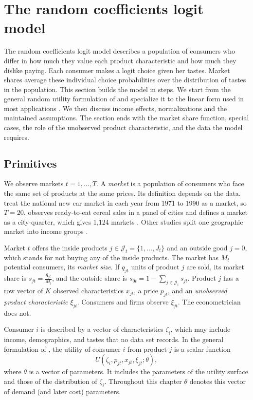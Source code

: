 \section{The random coefficients logit model}\label{sec:08-model}

The random coefficients logit model describes a population of consumers who differ in how much they value
each product characteristic and how much they dislike paying. Each consumer makes a logit choice given her
tastes. Market shares average these individual choice probabilities over the distribution of tastes in the
population. This section builds the model in steps. We start from the general random utility formulation of
\citet{BerryLevinsohnPakes1995} and specialize it to the linear form used in most applications
\citep{Nevo2000a,Nevo2001}. We then discuss income effects, normalizations and the maintained assumptions. The
section ends with the market share function, special cases, the role of the unobserved product characteristic,
and the data the model requires.

\subsection{Primitives}\label{sec:08-primitives}

We observe markets $t = 1, \dots, T$. A \emph{market} is a population of consumers who face the same set of
products at the same prices. Its definition depends on the data. \citet{BerryLevinsohnPakes1995} treat the
national new car market in each year from 1971 to 1990 as a market, so $T = 20$. \citet{Nevo2001} observes
ready-to-eat cereal sales in a panel of cities and defines a market as a city-quarter, which gives 1,124
markets \citep[p.~517]{Nevo2000a}. Other studies split one geographic market into income groups
\citep[p.~517]{Nevo2000a}.

Market $t$ offers the inside products $j \in \mathcal{J}_t = \{1, \dots, J_t\}$ and an outside good $j = 0$,
which stands for not buying any of the inside products. The market has $M_t$ potential consumers, its
\emph{market size}. If $q_{jt}$ units of product $j$ are sold, its market share is
$s_{jt} = \frac{q_{jt}}{M_t}$, and the outside share is $s_{0t} = 1 - \sum_{j \in \mathcal{J}_t} s_{jt}$.
Product $j$ has a row vector of $K$ observed characteristics $x_{jt}$, a price $p_{jt}$, and an
\emph{unobserved product characteristic} $\xi_{jt}$. Consumers and firms observe $\xi_{jt}$. The
econometrician does not.

Consumer $i$ is described by a vector of characteristics $\zeta_i$, which may include income, demographics,
and tastes that no data set records. In the general formulation of \citet[p.~845]{BerryLevinsohnPakes1995},
the utility of consumer $i$ from product $j$ is a scalar function
\begin{equation}\label{eq:08-general-utility}
  U(\zeta_i, p_{jt}, x_{jt}, \xi_{jt}; \theta),
\end{equation}
where $\theta$ is a vector of parameters. It includes the parameters of the utility surface and those of the
distribution of $\zeta_i$. Throughout this chapter $\theta$ denotes this vector of demand (and later cost)
parameters.

